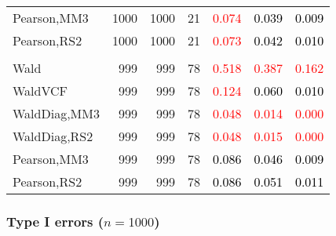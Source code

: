\documentclass[
]{article}
\begin{document}
\begin{table}[H]
{\begin{tabular}[t]{lrrrrrr}
\hspace{1em}Pearson,MM3 & 1000 & 1000 & 21 & \textcolor{red}{0.074} & \textcolor{black}{0.039} & \textcolor{black}{0.009}\\
\hspace{1em}Pearson,RS2 & 1000 & 1000 & 21 & \textcolor{red}{0.073} & \textcolor{black}{0.042} & \textcolor{black}{0.010}\\
\addlinespace[0.3em]
\multicolumn{7}{l}{\textbf{3F 15V}}\\
\hspace{1em}Wald & 999 & 999 & 78 & \textcolor{red}{0.518} & \textcolor{red}{0.387} & \textcolor{red}{0.162}\\
\hspace{1em}WaldVCF & 999 & 999 & 78 & \textcolor{red}{0.124} & \textcolor{black}{0.060} & \textcolor{black}{0.010}\\
\hspace{1em}WaldDiag,MM3 & 999 & 999 & 78 & \textcolor{red}{0.048} & \textcolor{red}{0.014} & \textcolor{red}{0.000}\\
\hspace{1em}WaldDiag,RS2 & 999 & 999 & 78 & \textcolor{red}{0.048} & \textcolor{red}{0.015} & \textcolor{red}{0.000}\\
\hspace{1em}Pearson,MM3 & 999 & 999 & 78 & \textcolor{black}{0.086} & \textcolor{black}{0.046} & \textcolor{black}{0.009}\\
\hspace{1em}Pearson,RS2 & 999 & 999 & 78 & \textcolor{black}{0.086} & \textcolor{black}{0.051} & \textcolor{black}{0.011}\\
\bottomrule
\end{tabular}}
\endgroup{}
\end{table}

\hypertarget{type-i-errors-n1000-2}{%
\subsubsection{\texorpdfstring{Type I errors
(\(n=1000\))}{Type I errors (n=1000)}}\label{type-i-errors-n1000-2}}
\end{document}
